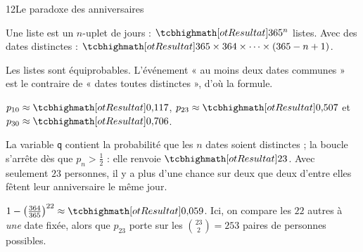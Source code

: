 \begin{corrige}{12}{Le paradoxe des anniversaires}
\noindent
\begin{minipage}[t]{0.56\linewidth}\vspace{0pt}\raggedright
\begin{questions}
  \item Une liste est un $n$-uplet de jours : $\res{365^{n}}$ listes. Avec des dates distinctes : $\res{365\times364\times\cdots\times(365-n+1)}$.
  \item Les listes sont équiprobables. L'événement « au moins deux dates communes » est le contraire de « dates toutes distinctes »,
    d'où la formule.
  \item $p_{10}\approx\res{0{,}117}$, $p_{23}\approx\res{0{,}507}$ et $p_{30}\approx\res{0{,}706}$.
  \item La variable \texttt{q} contient la probabilité que les $n$ dates soient distinctes ; la boucle s'arrête dès que $p_n>\frac12$ :
    elle renvoie $\res{23}$. Avec seulement $23$ personnes, il y a plus d'une chance sur deux que deux d'entre elles fêtent leur
    anniversaire le même jour.
  \item $1-\left(\frac{364}{365}\right)^{22}\approx\res{0{,}059}$. Ici, on compare les $22$ autres à \emph{une} date fixée, alors
    que $p_{23}$ porte sur les $\binom{23}{2}=253$ paires de personnes possibles.
\end{questions}
\end{minipage}\hfill
\begin{minipage}[t]{0.4\linewidth}\vspace{1mm}
\centering
{}\\[0.5mm]
\end{minipage}
\end{corrige}

